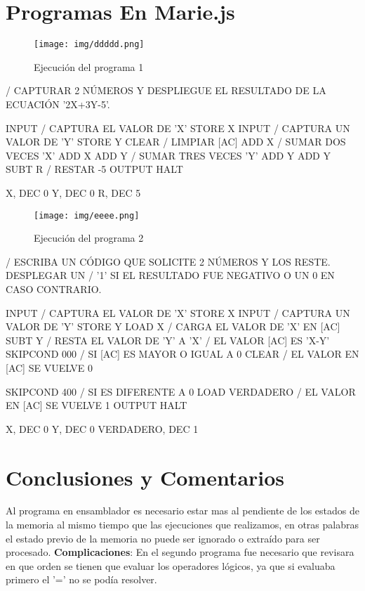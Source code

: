 \documentclass[12pt]{article}
\begin{document}
\section{Programas En Marie.js}
\label{sec:orga47a892}
\begin{figure}[htbp]
\centering
\texttt{[image: img/ddddd.png]}
\caption{Ejecución del programa 1}
\end{figure}

\begin{code}
/ CAPTURAR 2 NÚMEROS Y DESPLIEGUE EL RESULTADO DE LA ECUACIÓN '2X+3Y-5'.

INPUT                                  / CAPTURA EL VALOR DE 'X'
STORE X                          
INPUT                                  / CAPTURA UN VALOR DE 'Y'
STORE Y                          
CLEAR                                  / LIMPIAR [AC]
ADD X                                  / SUMAR DOS VECES 'X'
ADD X 
ADD Y                                  / SUMAR TRES VECES 'Y'
ADD Y
ADD Y
SUBT R                                 / RESTAR -5
OUTPUT
HALT

X, DEC 0
Y, DEC 0
R, DEC 5
\end{code}

\begin{figure}[htbp]
\centering
\texttt{[image: img/eeee.png]}
\caption{Ejecución del programa 2}
\end{figure}

\begin{code}
/ ESCRIBA UN CÓDIGO QUE SOLICITE 2 NÚMEROS Y LOS RESTE. DESPLEGAR UN 
/ '1' SI EL RESULTADO FUE NEGATIVO O UN 0 EN CASO CONTRARIO.  

INPUT                                  / CAPTURA EL VALOR DE 'X'
STORE X                          
INPUT                                  / CAPTURA UN VALOR DE 'Y'
STORE Y                          
LOAD X                                 / CARGA EL VALOR DE 'X' EN [AC]
SUBT Y                                 / RESTA EL VALOR DE 'Y' A 'X' 
                                       / EL VALOR [AC] ES 'X-Y'
SKIPCOND 000                           / SI [AC] ES MAYOR O IGUAL A 0 
CLEAR                                  / EL VALOR EN [AC] SE VUELVE 0

SKIPCOND 400                           / SI ES DIFERENTE A 0
LOAD VERDADERO                         / EL VALOR EN [AC] SE VUELVE 1
OUTPUT
HALT

X, DEC 0
Y, DEC 0
VERDADERO, DEC 1
\end{code}


\section{Conclusiones y Comentarios}
\label{sec:orgd513835}
Al programa en ensamblador es necesario estar mas al pendiente de los estados de la memoria al mismo tiempo que las ejecuciones que realizamos, en otras palabras el estado previo de la memoria no puede ser ignorado o extraído para ser procesado. \textbf{Complicaciones}: En el segundo programa fue necesario que revisara en que orden se tienen que evaluar los operadores  lógicos, ya que si evaluaba primero el '=' no se podía resolver.
\end{document}
